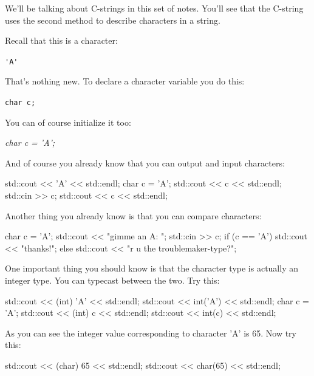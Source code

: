 We'll be talking about C-strings in this set of notes. You'll see that the C-string uses the second method to describe characters in a string.


\newpage{}

Recall that this is a character:

\begin{center}
\verb!'A'!
\end{center}

That's nothing new. To declare a character variable you do this:

\begin{center}
\texttt{char c;}
\end{center}

You can of course initialize it too:

\begin{center}
\textit{char c = 'A';}
\end{center}

And of course you already know that you can output and input characters:

\begin{consolethree}[escapeinside=||]
std::cout << 'A' << std::endl;
char c = 'A';
std::cout << c << std::endl;
std::cin >> c;
std::cout << c << std::endl;
\end{consolethree}

Another thing you already know is that you can compare characters:

\begin{consolethree}[escapeinside=||]
char c = 'A';
std::cout << "gimme an A: ";
std::cin >> c;
if (c == 'A')
{
    std::cout << "thanks!";
}
else
{
    std::cout << "r u the troublemaker-type?";
}
\end{consolethree}


\newpage{}

One important thing you should know is that the character type is actually an integer type. You can typecast between the two. Try this:

\begin{consolethree}[escapeinside=||]
std::cout << (int) 'A' << std::endl;
std::cout << int('A') << std::endl;
char c = 'A';
std::cout << (int) c << std::endl;
std::cout << int(c) << std::endl;
\end{consolethree}

As you can see the integer value corresponding to character
'A' is 65. Now try this:

\begin{consolethree}[escapeinside=||]
std::cout << (char) 65 << std::endl;
std::cout << char(65) << std::endl;
\end{consolethree}

